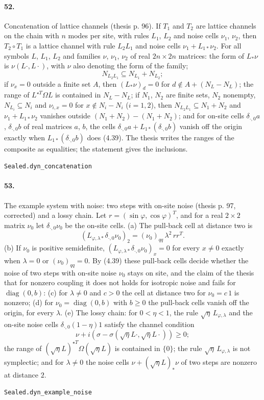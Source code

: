 \documentclass[11pt]{article}
\begin{document}
\paragraph{52.} Concatenation of lattice channels (thesis p. 96). If $T_1$ and $T_2$ are lattice channels on the chain with $n$ modes per site, with rules $L_1$, $L_2$ and noise cells $\nu_1$, $\nu_2$, then $T_2 \circ T_1$ is a lattice channel with rule $L_2 L_1$ and noise cells $\nu_1 + L_{1*}\nu_2$. For all symbols $L$, $L_1$, $L_2$ and families $\nu$, $\nu_1$, $\nu_2$ of real $2n \times 2n$ matrices: the form of $L_*\nu$ is $\nu(L\cdot, L\cdot)$, with $\nu$ also denoting the form of the family; \[N_{L_2 L_1} \subseteq N_{L_1} + N_{L_2};\] if $\nu_x = 0$ outside a finite set $A$, then $(L_*\nu)_d = 0$ for $d \notin A + (N_L - N_L)$; the range of $L^{\star T}\Omega L$ is contained in $N_L - N_L$; if $N_1$, $N_2$ are finite sets, $N_2$ nonempty, $N_{L_i} \subseteq N_i$ and $\nu_{i, x} = 0$ for $x \notin N_i - N_i$ ($i = 1, 2$), then $N_{L_2 L_1} \subseteq N_1 + N_2$ and $\nu_1 + L_{1*}\nu_2$ vanishes outside $(N_1 + N_2) - (N_1 + N_2)$; and for on-site cells $\delta_{\cdot, 0} a$, $\delta_{\cdot, 0} b$ of real matrices $a$, $b$, the cells $\delta_{\cdot, 0} a + L_{1*}(\delta_{\cdot, 0} b)$ vanish off the origin exactly when $L_{1*}(\delta_{\cdot, 0} b)$ does (4.39). The thesis writes the ranges of the composite as equalities; the statement gives the inclusions.\par{\footnotesize\texttt{Sealed.dyn\_concatenation}}

\paragraph{53.} The example system with noise: two steps with on-site noise (thesis p. 97, corrected) and a lossy chain. Let $r = (\sin\varphi, \cos\varphi)^T$, and for a real $2 \times 2$ matrix $\nu_0$ let $\delta_{\cdot, 0}\nu_0$ be the on-site cells. (a) The pull-back cell at distance two is \[(L_{\varphi, \lambda *}\delta_{\cdot, 0}\nu_0)_2 = (\nu_0)_{qq}\, \lambda^2\, r r^T.\] (b) If $\nu_0$ is positive semidefinite, $(L_{\varphi, \lambda *}\delta_{\cdot, 0}\nu_0)_x = 0$ for every $x \neq 0$ exactly when $\lambda = 0$ or $(\nu_0)_{qq} = 0$. By (4.39) these pull-back cells decide whether the noise of two steps with on-site noise $\nu_0$ stays on site, and the claim of the thesis that for nonzero coupling it does not holds for isotropic noise and fails for $\operatorname{diag}(0, b)$: (c) for $\lambda \neq 0$ and $c > 0$ the cell at distance two for $\nu_0 = c\, 1$ is nonzero; (d) for $\nu_0 = \operatorname{diag}(0, b)$ with $b \ge 0$ the pull-back cells vanish off the origin, for every $\lambda$. (e) The lossy chain: for $0 < \eta < 1$, the rule $\sqrt\eta\, L_{\varphi, \lambda}$ and the on-site noise cells $\delta_{\cdot, 0}(1 - \eta) 1$ satisfy the channel condition \[\nu + i(\sigma - \sigma(\sqrt\eta L\cdot, \sqrt\eta L\cdot)) \ge 0;\] the range of $(\sqrt\eta L)^{\star T}\Omega(\sqrt\eta L)$ is contained in $\{0\}$; the rule $\sqrt\eta\, L_{\varphi, \lambda}$ is not symplectic; and for $\lambda \neq 0$ the noise cells $\nu + (\sqrt\eta L)_*\nu$ of two steps are nonzero at distance $2$.\par{\footnotesize\texttt{Sealed.dyn\_example\_noise}}
\end{document}
